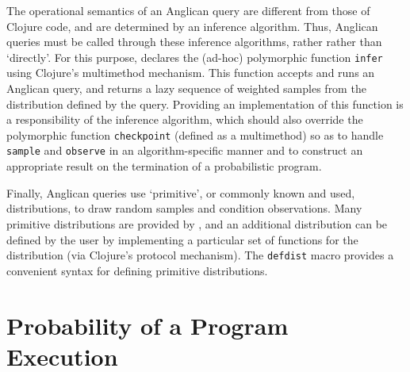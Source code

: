 \documentclass[preprint]{sigplanconf}
\begin{document}
The operational semantics of an Anglican query are different from those
of Clojure code, and are determined by an inference algorithm. Thus,
Anglican queries must be called through these inference algorithms, rather
rather than `directly'. For this purpose,
\iftoggle{full}{the
\texttt{anglican.inference} namespace}{Anglican} declares the (ad-hoc) polymorphic
function \texttt{infer} using Clojure's multimethod mechanism.
This function accepts and runs an Anglican query, 
and returns a lazy sequence of weighted samples from the
distribution defined by the query. Providing an implementation of this function
is a responsibility of the inference algorithm, which should also
override the polymorphic function \texttt{checkpoint} (defined
as a multimethod) so as to handle \texttt{sample} and
\texttt{observe} in an algorithm-specific manner and
to construct an appropriate result on the
termination of a probabilistic program.


Finally, Anglican queries use `primitive', or commonly known and
used, distributions, to draw random samples and condition
observations. Many primitive distributions are provided by
\iftoggle{full}{the \texttt{anglican.runtime} namespace}{the
runtime}, and an additional distribution can be defined by the
user by implementing a particular set of functions for the
distribution (via Clojure's protocol mechanism). The
\texttt{defdist} macro provides a convenient syntax for defining
primitive distributions.

\section{Probability of a Program Execution}
\label{sec:pp-def}
\end{document}
